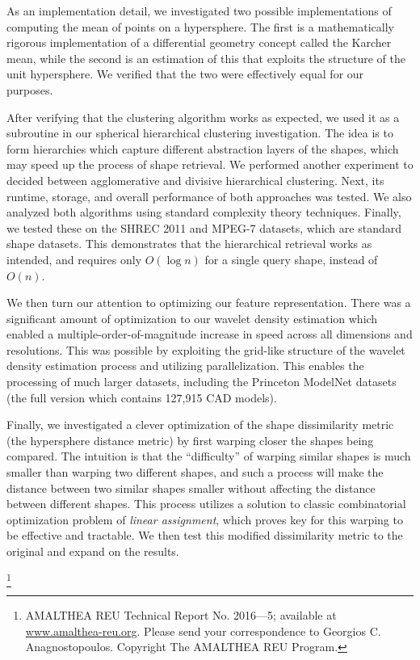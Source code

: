 \documentclass[../tech_report_1.tex]{subfiles}
\newcommand\blfootnote[1]{%
  \begingroup
  \renewcommand\thefootnote{}\footnote{#1}%
  \addtocounter{footnote}{-1}%
  \endgroup
}
\begin{document}
As an implementation detail, we investigated two possible implementations of computing the mean of points on a hypersphere. The first is a mathematically rigorous implementation of a differential geometry concept called the Karcher mean, while the second is an estimation of this that exploits the structure of the unit hypersphere. We verified that the two were effectively equal for our purposes.

After verifying that the clustering algorithm works as expected, we used it as a subroutine in our spherical hierarchical clustering investigation. The idea is to form hierarchies which capture different abstraction layers of the shapes, which may speed up the process of shape retrieval. We performed another experiment to decided between agglomerative and divisive hierarchical clustering. Next, its runtime, storage, and overall performance of both approaches was tested. We also analyzed both algorithms using standard complexity theory techniques. Finally, we tested these on the SHREC 2011 \cite{boyer2011shrec} and MPEG-7 \cite{bober2001mpeg} datasets, which are standard shape datasets. This demonstrates that the hierarchical retrieval works as intended, and requires only $O(\log n)$ for a single query shape, instead of $O(n)$.

We then turn our attention to optimizing our feature representation. There was a significant amount of optimization to our wavelet density estimation which enabled a multiple-order-of-magnitude increase in speed across all dimensions and resolutions. This was possible by exploiting the grid-like structure of the wavelet density estimation process and utilizing parallelization. This enables the processing of much larger datasets, including the Princeton ModelNet datasets (the full version which contains 127,915 CAD models).

Finally, we investigated a clever optimization of the shape dissimilarity metric (the hypersphere distance metric) by first warping closer the shapes being compared. The intuition is that the ``difficulty'' of warping similar shapes is much smaller than warping two different shapes, and such a process will make the distance between two similar shapes smaller without affecting the distance between different shapes. This process utilizes a solution to classic combinatorial optimization problem of \textit{linear assignment}, which proves key for this warping to be effective and tractable. We then test this modified dissimilarity metric to the original and expand on the results.

\blfootnote{AMALTHEA REU Technical Report No. 2016–--5; available at \href{www.amalthea-reu.org}{www.amalthea-reu.org}. Please send your correspondence to Georgios C. Anagnostopoulos. Copyright \textcopyright \thickspace 2016 The AMALTHEA REU Program.}
\end{document}

